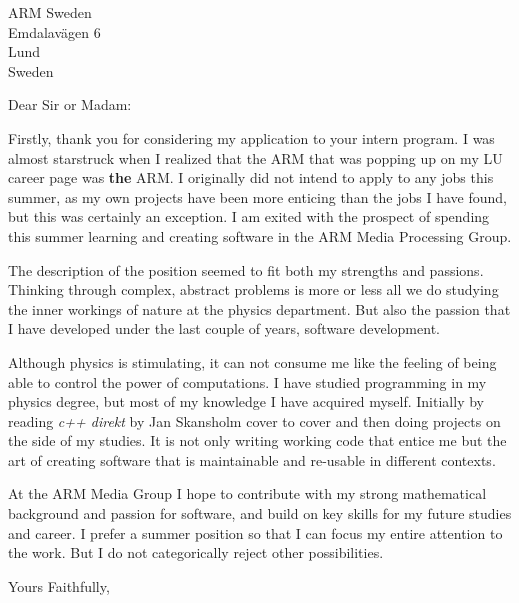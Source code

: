 \documentclass[10pt]{letter}
\begin{document}
\begin{letter}{ARM Sweden\\ Emdalavägen 6\\ Lund\\ Sweden}
\opening{Dear Sir or Madam:}

Firstly, thank you for considering my application to your intern
program. I was almost starstruck when I realized that the ARM that
was popping up on my LU career page was {\bf the} ARM. I originally
did not intend to apply to any jobs this summer, as my own projects
have been more enticing than the jobs I have found, but this was
certainly an exception. I am exited with the prospect of spending this
summer learning and creating software in the ARM Media Processing
Group. 

The description of the position seemed to fit both my strengths and
passions. Thinking through complex, abstract problems is more or less
all we do studying the inner workings of nature at the physics
department. But also the passion that I have developed under the last
couple of years, software development.

Although physics is stimulating, it can not consume me like the
feeling of being able to control the power of computations. I have
studied programming in my physics degree, but most of my knowledge I
have acquired myself. Initially by reading { \it c++ direkt} by Jan
Skansholm cover to cover and then doing projects on the side of my
studies. It is not only writing working code that entice me but the
art of creating software that is maintainable and re-usable in
different contexts. 

At the ARM Media Group I hope to contribute with my strong
mathematical background and passion for software, and build on key
skills for my future studies and career. I prefer a summer position so
that I can focus my entire attention to the work. But I do not
categorically reject other possibilities.


\closing{Yours Faithfully,}
\end{letter}
\end{document}
